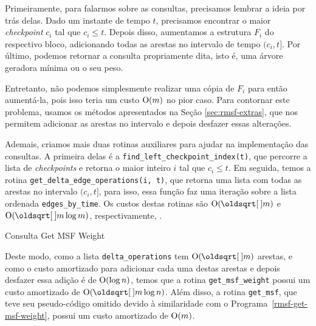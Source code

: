 Primeiramente, para falarmos sobre as consultas, precisamos lembrar a ideia por trás delas. Dado um instante de tempo $t$, precisamos encontrar o maior \emph{checkpoint} $c_i$ tal que $c_i \leq t$. Depois disso, aumentamos a estrutura $F_i$ do respectivo bloco, adicionando todas as arestas no intervalo de tempo $(c_i, t]$. Por último, podemos retornar a consulta propriamente dita, isto é, uma árvore geradora mínima ou o seu peso.

Entretanto, não podemos simplesmente realizar uma cópia de $F_i$ para então aumentá-la, pois isso teria um custo $\mathrm{O}(m)$ no pior caso. Para contornar este problema, usamos os métodos apresentados na Seção \ref{sec:rmsf-extras}, que nos permitem adicionar as arestas no intervalo e depois desfazer essas alterações.

Ademais, criamos mais duas rotinas auxiliares para ajudar na implementação das consultas. A primeira delas é a \texttt{find\_left\_checkpoint\_index(t)}, que percorre a lista de \emph{checkpoints} e retorna o maior inteiro $i$ tal que $c_i \leq t$. Em seguida, temos a rotina \texttt{get\_delta\_edge\_operations(i, t)}, que retorna uma lista com todas as arestas no intervalo $(c_i, t]$, para isso, essa função faz uma iteração sobre a lista ordenada \texttt{edges\_by\_time}. Os custos destas rotinas são $\Oh(\sqrt{m})$ e $\Oh(\sqrt{m}\log{m})$, respectivamente, .

\begin{algorithm}[h!]
    \caption{Consulta Get MSF Weight}\label{rmsf-get-msf-weight}
    \begin{algorithmic}[1]
        \State {}
        \EndFunction
    \end{algorithmic}
\end{algorithm}

Deste modo, como a lista \texttt{delta\_operations} tem $\Oh(\sqrt{m})$ arestas, e como o custo amortizado para adicionar cada uma destas arestas e depois desfazer essa adição é de $\mathrm{O}(\log{n})$, temos que a rotina \texttt{get\_msf\_weight} possui um custo amortizado de $\Oh(\sqrt{m} \log{n})$. Além disso, a rotina \texttt{get\_msf}, que teve seu pseudo-código omitido devido à similaridade com o Programa~\ref{rmsf-get-msf-weight}, possui um custo amortizado de $\mathrm{O}(m)$.

